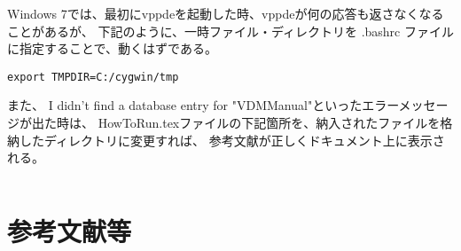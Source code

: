 \documentclass[a4paper,8pt]{jsarticle}
\begin{document}
Windows 7では、最初にvppdeを起動した時、vppdeが何の応答も返さなくなることがあるが、
下記のように、一時ファイル・ディレクトリを .bashrc ファイルに指定することで、動くはずである。

\begin{verbatim}
export TMPDIR=C:/cygwin/tmp
\end{verbatim}

また、 I didn't find a database entry for "VDMManual"といったエラーメッセージが出た時は、
HowToRun.texファイルの下記箇所を、納入されたファイルを格納したディレクトリに変更すれば、
参考文献が正しくドキュメント上に表示される。

\begin{verbatim}

\end{verbatim}

\section{参考文献等}


%



\end{document}
